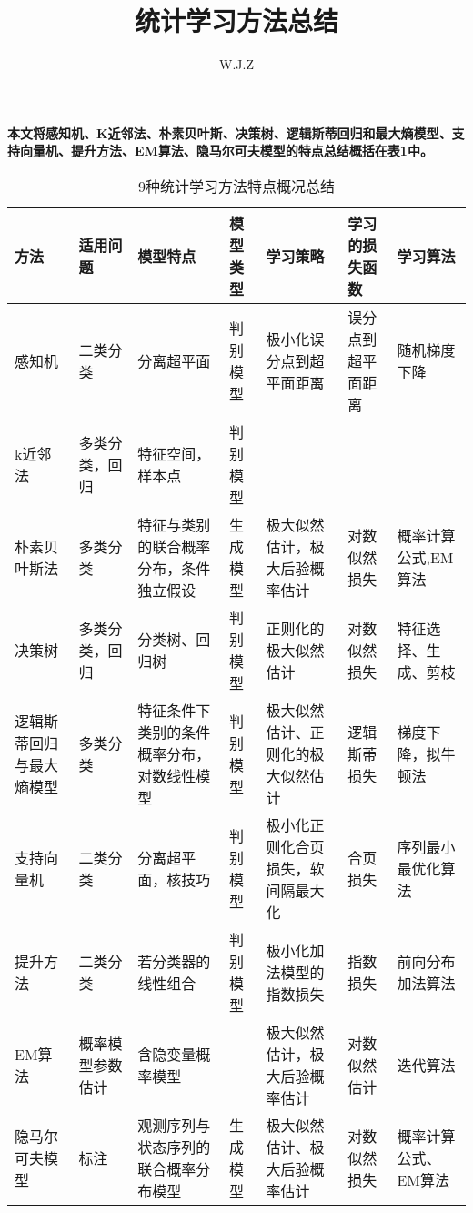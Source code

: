 \documentclass{article}
\title{统计学习方法总结}
\author{W.J.Z}
\date{}
\begin{document}
	\maketitle
	\textbf{\small 本文将感知机、K近邻法、朴素贝叶斯、决策树、逻辑斯蒂回归和最大熵模型、支持向量机、提升方法、EM算法、隐马尔可夫模型的特点总结概括在表1中。}
	\begin{table}[h]
		\caption{9种统计学习方法特点概况总结}
		\centering
		\begin{tabular}{|p{1.7cm}|p{1.7cm}|p{1.7cm}|p{1.7cm}|p{1.7cm}|p{1.7cm}|p{1.7cm}|}
			\hline
			方法 & 适用问题 & 模型特点 & 模型类型 & 学习策略 & 学习的损失函数 & 学习算法 \\
			\hline
			感知机 & 二类分类 & 分离超平面 & 判别模型 & 极小化误分点到超平面距离 & 误分点到超平面距离 & 随机梯度下降 \\
			\hline
			k近邻法 & 多类分类，回归 & 特征空间，样本点& 判别模型& & & \\
			\hline
			朴素贝叶斯法 & 多类分类& 特征与类别的联合概率分布，条件独立假设 & 生成模型 & 极大似然估计，极大后验概率估计&对数似然损失 & 概率计算公式,EM算法\\
			\hline
			决策树 & 多类分类，回归 &分类树、回归树 & 判别模型 & 正则化的极大似然估计 & 对数似然损失 & 特征选择、生成、剪枝\\
			\hline
			逻辑斯蒂回归与最大熵模型 & 多类分类 & 特征条件下类别的条件概率分布，对数线性模型 & 判别模型 & 极大似然估计、正则化的极大似然估计& 逻辑斯蒂损失 & 梯度下降，拟牛顿法 \\
			\hline
			支持向量机 & 二类分类 & 分离超平面，核技巧 & 判别模型 & 极小化正则化合页损失，软间隔最大化 & 合页损失 &序列最小最优化算法 \\
			\hline 
			提升方法 & 二类分类 & 若分类器的线性组合 & 判别模型& 极小化加法模型的指数损失 & 指数损失 & 前向分布加法算法 \\
			\hline
			EM算法 & 概率模型参数估计 & 含隐变量概率模型 & &极大似然估计，极大后验概率估计&对数似然估计&迭代算法 \\
			\hline
			隐马尔可夫模型 & 标注 & 观测序列与状态序列的联合概率分布模型 & 生成模型 & 极大似然估计、极大后验概率估计&对数似然损失 & 概率计算公式、EM算法\\
			\hline
		\end{tabular}
	\end{table}
\end{document}
